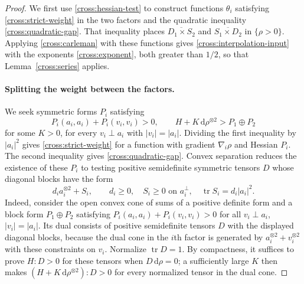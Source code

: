 \documentclass[11pt,a4paper]{article}
\theoremstyle{definition}
\theoremstyle{remark}
\newcommand{\dd}{\mathrm d}
\DeclareMathOperator{\tr}{tr}
\numberwithin{equation}{section}
\begin{document}
\begin{proof}
We first use \eqref{cross:hessian-test} to construct functions
$\theta_i$ satisfying \eqref{cross:strict-weight} in the two
factors and the quadratic inequality \eqref{cross:quadratic-gap}.
That inequality places $\overline{D_1\times S_2}$ and
$\overline{S_1\times D_2}$ in $\{\rho>0\}$. Applying
\eqref{cross:carleman} with these functions gives
\eqref{cross:interpolation-input} with the exponents
\eqref{cross:exponent}, both greater than $1/2$, so that
Lemma~\ref{cross:series} applies.

\paragraph{Splitting the weight between the factors.}
We seek symmetric forms $P_i$ satisfying
\[
 P_i(a_i,a_i)+P_i(v_i,v_i)>0,
 \qquad H+K\,\dd\rho^{\otimes2}>P_1\oplus P_2
\]
for some $K>0$, for every $v_i\perp a_i$ with
$|v_i|=|a_i|$. Dividing the first inequality by $|a_i|^2$ gives
\eqref{cross:strict-weight} for a function with gradient
$\nabla_i\rho$ and Hessian $P_i$. The second inequality gives
\eqref{cross:quadratic-gap}. Convex separation reduces the existence
of these $P_i$ to testing positive semidefinite symmetric tensors
$D$ whose diagonal blocks have the form
\[
 d_i a_i^{\otimes2}+S_i,\qquad
 d_i\ge0,\quad S_i\ge0\text{ on }a_i^\perp,
 \quad \tr S_i=d_i|a_i|^2.
\]
Indeed, consider the open convex cone of sums of a positive
definite form and a block form $P_1\oplus P_2$ satisfying
$P_i(a_i,a_i)+P_i(v_i,v_i)>0$ for all
$v_i\perp a_i$, $|v_i|=|a_i|$. Its dual consists of positive
semidefinite tensors $D$ with the displayed diagonal blocks, because
the dual cone in the $i$th factor is generated by
$a_i^{\otimes2}+v_i^{\otimes2}$ with these constraints on $v_i$.
Normalize $\tr D=1$. By compactness, it suffices to prove
$H:D>0$ for these tensors when $D\,\dd\rho=0$; a sufficiently large
$K$ then makes $(H+K\,\dd\rho^{\otimes2}):D>0$ for every normalized
tensor in the dual cone.


\end{proof}
\end{document}
